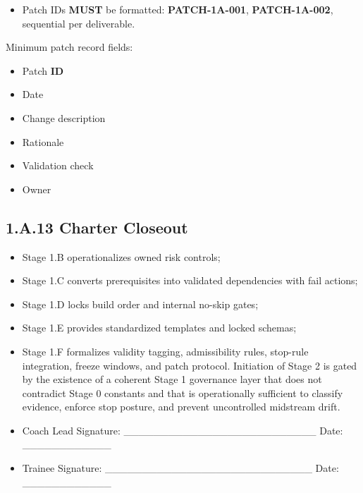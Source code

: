 \documentclass[10pt]{article}
\begin{document}
\begin{itemize}
\item Patch IDs \textbf{MUST} be formatted: \textbf{PATCH-1A-001}, \textbf{PATCH-1A-002}, sequential per deliverable.
\end{itemize}

Minimum patch record fields:

\begin{itemize}
\item Patch \textbf{ID}
\item Date
\item Change description
\item Rationale
\item Validation check
\item Owner
\end{itemize}

\subsection*{1.A.13 Charter Closeout}
{}

\begin{itemize}
This charter governs the construction of Stage 1.B through Stage 1.F by fixing mission, scope boundaries, non-negotiable constraints, safety posture, evidence posture, roles, decision authority, and controlled change discipline.
\item Stage 1.B operationalizes owned risk controls;
\item Stage 1.C converts prerequisites into validated dependencies with fail actions;
\item Stage 1.D locks build order and internal no-skip gates;
\item Stage 1.E provides standardized templates and locked schemas;
\item Stage 1.F formalizes validity tagging, admissibility rules, stop-rule integration, freeze windows, and patch protocol. Initiation of Stage 2 is gated by the existence of a coherent Stage 1 governance layer that does not contradict Stage 0 constants and that is operationally sufficient to classify evidence, enforce stop posture, and prevent uncontrolled midstream drift.
\end{itemize}

\begin{itemize}
\item Coach Lead Signature: \_\_\_\_\_\_\_\_\_\_\_\_\_\_\_\_\_\_\_\_\_\_\_\_\_\_  Date: \_\_\_\_\_\_\_\_\_\_\_\_
\item Trainee Signature: \_\_\_\_\_\_\_\_\_\_\_\_\_\_\_\_\_\_\_\_\_\_\_\_\_\_\_\_  Date: \_\_\_\_\_\_\_\_\_\_\_\_
\end{itemize}
\end{document}
